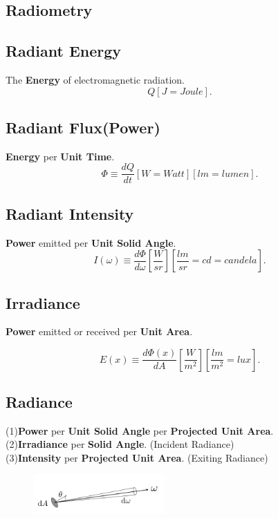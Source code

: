 \documentclass[10pt,landscape,a4paper] {extarticle}
\begin{document}
\begin{multicols}{3}

\section{Radiometry}

\subsection{Radiant Energy}

The \textbf{Energy} of electromagnetic radiation. \\
\[
	Q[J=Joule]
.\] 

\subsection{Radiant Flux(Power)}

\textbf{Energy} per \textbf{Unit Time}.
\[
	\Phi \equiv \frac{dQ}{dt} [W=Watt] [lm=lumen]
.\] 

\subsection{Radiant Intensity} 

\textbf{Power} emitted per \textbf{Unit Solid Angle}.
\[
	I(\omega)\equiv\frac{d\Phi}{d\omega}
	\left [ \frac{W}{sr} \right ] \left [ \frac{lm}{sr}=cd=candela \right ]
.\] 

\subsection{Irradiance}

\textbf{Power} emitted or received per \textbf{Unit Area}.

\[
	E(x) \equiv \frac{d\Phi(x)}{dA}
	\left [ \frac{W}{m^2} \right ] \left [ \frac{lm}{m^2}=lux \right ]
.\] 

\subsection{Radiance}

(1)\textbf{Power} per \textbf{Unit Solid Angle} per \textbf{Projected Unit Area}.\\
(2)\textbf{Irradiance} per \textbf{Solid Angle}. (Incident Radiance)\\
(3)\textbf{Intensity} per \textbf{Projected Unit Area}. (Exiting Radiance)

\begin{figure}[H]
\centering
\includegraphics[width=5cm]{img/radiance.png}
\end{figure}


\end{multicols}
\end{document}

